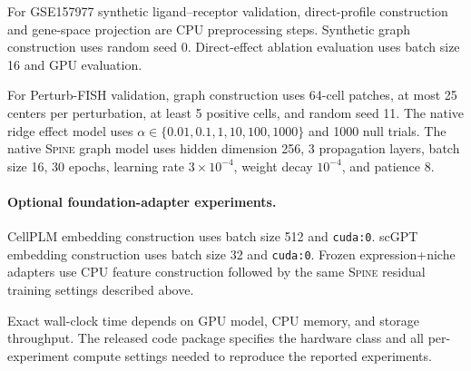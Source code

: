 \documentclass[sigconf,review,balance=false]{acmart}
\newcommand{\methodname}{\textsc{Spine}\xspace}
\begin{document}
For GSE157977 synthetic ligand--receptor validation, direct-profile construction and gene-space projection are CPU preprocessing steps. Synthetic graph construction uses random seed 0. Direct-effect ablation evaluation uses batch size 16 and GPU evaluation.

For Perturb-FISH validation, graph construction uses 64-cell patches, at most 25 centers per perturbation, at least 5 positive cells, and random seed 11. The native ridge effect model uses $\alpha\in\{0.01,0.1,1,10,100,1000\}$ and 1000 null trials. The native \methodname{} graph model uses hidden dimension 256, 3 propagation layers, batch size 16, 30 epochs, learning rate $3\times10^{-4}$, weight decay $10^{-4}$, and patience 8.

\paragraph{Optional foundation-adapter experiments.}
CellPLM embedding construction uses batch size 512 and \texttt{cuda:0}. scGPT embedding construction uses batch size 32 and \texttt{cuda:0}. Frozen expression+niche adapters use CPU feature construction followed by the same \methodname{} residual training settings described above.

Exact wall-clock time depends on GPU model, CPU memory, and storage throughput. The released code package specifies the hardware class and all per-experiment compute settings needed to reproduce the reported experiments.
\end{document}
